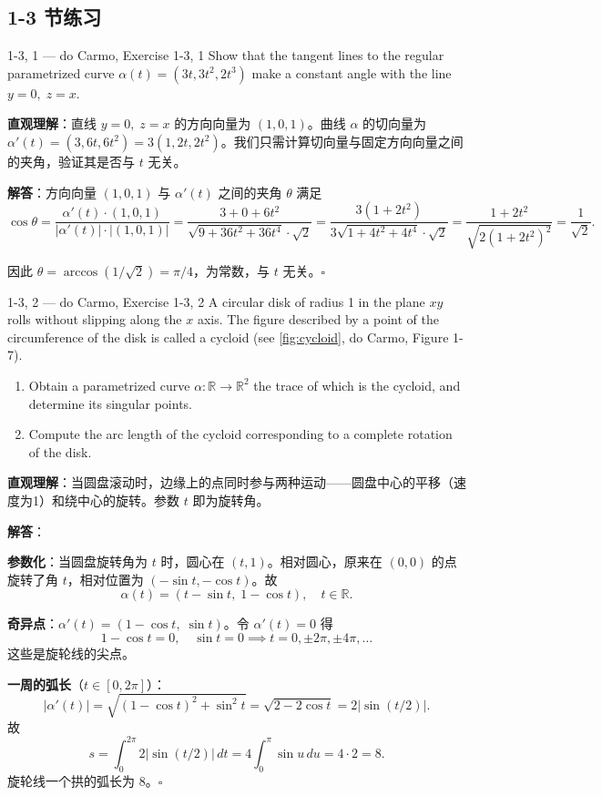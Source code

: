 \subsection*{1-3 节练习}

\begin{exercise}{1-3, 1 — do Carmo, Exercise 1-3, 1}
Show that the tangent lines to the regular parametrized curve $\alpha(t) = (3t, 3t^2, 2t^3)$ make a constant angle with the line $y = 0,\; z = x$.
\end{exercise}

\begin{solution}
\textbf{直观理解}：直线 $y=0,\; z=x$ 的方向向量为 $(1, 0, 1)$。曲线 $\alpha$ 的切向量为 $\alpha'(t) = (3, 6t, 6t^2) = 3(1, 2t, 2t^2)$。我们只需计算切向量与固定方向向量之间的夹角，验证其是否与 $t$ 无关。

\textbf{解答}：方向向量 $(1,0,1)$ 与 $\alpha'(t)$ 之间的夹角 $\theta$ 满足
\[
\cos\theta = \frac{\alpha'(t) \cdot (1,0,1)}{|\alpha'(t)| \cdot |(1,0,1)|} = \frac{3 + 0 + 6t^2}{\sqrt{9 + 36t^2 + 36t^4} \cdot \sqrt{2}} = \frac{3(1 + 2t^2)}{3\sqrt{1 + 4t^2 + 4t^4}\cdot\sqrt{2}} = \frac{1 + 2t^2}{\sqrt{2(1 + 2t^2)^2}} = \frac{1}{\sqrt{2}}.
\]

因此 $\theta = \arccos(1/\sqrt{2}) = \pi/4$，为常数，与 $t$ 无关。$\square$
\end{solution}

\begin{exercise}{1-3, 2 — do Carmo, Exercise 1-3, 2}
A circular disk of radius 1 in the plane $xy$ rolls without slipping along the $x$ axis. The figure described by a point of the circumference of the disk is called a cycloid (see \cref{fig:cycloid}, do Carmo, Figure 1-7).
\begin{enumerate}
\item[a.] Obtain a parametrized curve $\alpha: \mathbb{R} \to \mathbb{R}^2$ the trace of which is the cycloid, and determine its singular points.
\item[b.] Compute the arc length of the cycloid corresponding to a complete rotation of the disk.
\end{enumerate}
\end{exercise}

\begin{solution}
\textbf{直观理解}：当圆盘滚动时，边缘上的点同时参与两种运动——圆盘中心的平移（速度为1）和绕中心的旋转。参数 $t$ 即为旋转角。

\textbf{解答}：

\textbf{参数化}：当圆盘旋转角为 $t$ 时，圆心在 $(t, 1)$。相对圆心，原来在 $(0,0)$ 的点旋转了角 $t$，相对位置为 $(-\sin t, -\cos t)$。故
\[
\alpha(t) = (t - \sin t,\; 1 - \cos t),\quad t \in \mathbb{R}.
\]

\textbf{奇异点}：$\alpha'(t) = (1 - \cos t,\; \sin t)$。令 $\alpha'(t) = 0$ 得
\[
1 - \cos t = 0,\quad \sin t = 0 \implies t = 0, \pm 2\pi, \pm 4\pi, \ldots
\]
这些是旋轮线的尖点。

\textbf{一周的弧长}（$t \in [0, 2\pi]$）：
\[
|\alpha'(t)| = \sqrt{(1 - \cos t)^2 + \sin^2 t} = \sqrt{2 - 2\cos t} = 2|\sin(t/2)|.
\]
故
\[
s = \int_0^{2\pi} 2|\sin(t/2)|\, dt = 4\int_0^{\pi} \sin u\, du = 4 \cdot 2 = 8.
\]
旋轮线一个拱的弧长为 $8$。$\square$
\end{solution}


